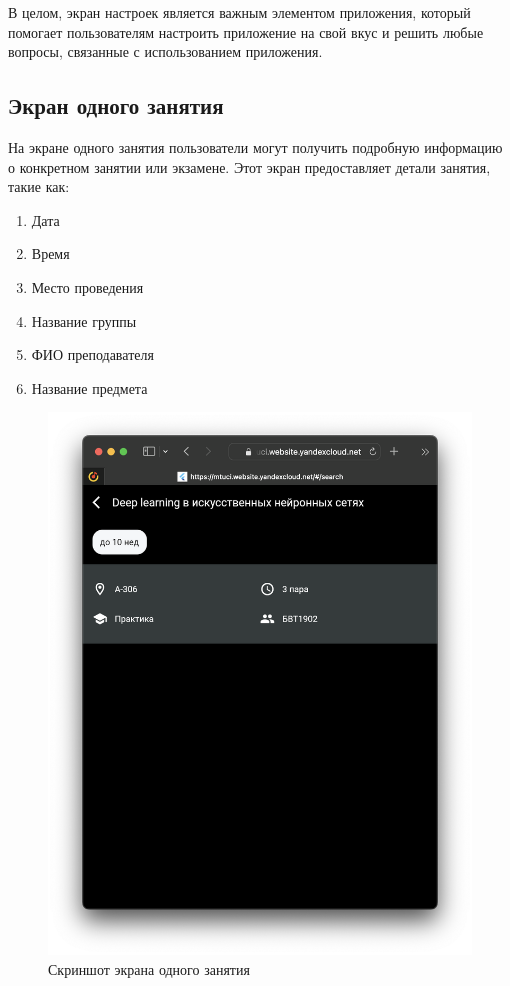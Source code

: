 В целом, экран настроек является важным элементом приложения,
который помогает пользователям настроить приложение на свой вкус и
решить любые вопросы, связанные с использованием приложения.

\subsection{Экран одного занятия}
На экране одного занятия пользователи могут получить подробную информацию о конкретном занятии или экзамене.
Этот экран предоставляет детали занятия,
такие как:
\begin{enumerate}
    \item Дата
    \item Время
    \item Место проведения
    \item Название группы
    \item ФИО преподавателя
    \item Название предмета
\end{enumerate}

\begin{figure}
\centering
\includegraphics[width=0.8\linewidth]{images/app/lesson.png}
\caption{Скриншот экрана одного занятия}
\label{fig:app:lesson}
\end{figure}

